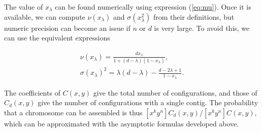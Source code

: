 \documentclass{article}
\begin{document}
The value of $x_\lambda$ can be found numerically using expression
(\ref{eq:mu}).  Once it is available, we can compute $\nu(x_\lambda)$ and
$\sigma(x_\lambda^2)$ from their definitions, but numeric precision can
become an issue if $n$ or $d$ is very large. To avoid this, we can use the
equivalent expressions


\begin{gather}
\label{eq:nu} %
\nu(x_\lambda) = \frac{dx_\lambda}{1+(d-\lambda)(1-x_\lambda)}, \\
\label{eq:sigma} %
\sigma(x_\lambda)^2 = \lambda(d-\lambda) -
  \frac{d-2\lambda+1}{1-x_\lambda}.
\end{gather}

The coefficients of $C(x,y)$ give the total number of configurations, and
those of $C_d(x,y)$ give the number of configurations with a single
contig. The probability that a chromosome can be assembled is thus
$[x^ky^n] C_d(x,y) / [x^ky^n] C(x,y)$, which can be approximated with the
asymptotic formulas developed above.
\end{document}
